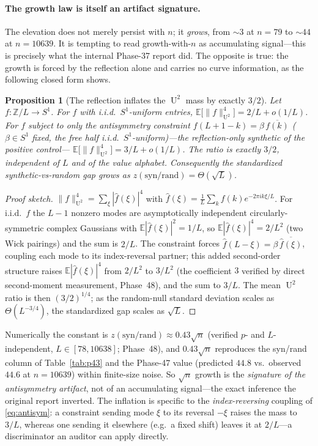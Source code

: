 \documentclass[11pt]{article}
\newtheorem{proposition}{Proposition}
\theoremstyle{definition}
\newcommand{\Z}{\mathbb{Z}}
\DeclareMathOperator{\Uk}{U}
\begin{document}
\paragraph{The growth law is itself an artifact signature.} The elevation
does not merely persist with $n$; it \emph{grows}, from $\sim3$ at $n=79$
to $\sim44$ at $n=10639$. It is tempting to read growth-with-$n$ as
accumulating signal---this is precisely what the internal Phase-37 report
did. The opposite is true: the growth is forced by the reflection alone
and carries no curve information, as the following closed form shows.

\begin{proposition}[The reflection inflates the $\Uk^2$ mass by exactly
$3/2$]\label{prop:scaling}
Let $f\colon\Z/L\to S^1$. For $f$ with i.i.d.\ $S^1$-uniform entries,
$\mathbb E\big[\|f\|_{\Uk^2}^4\big]=2/L+o(1/L)$. For $f$ subject to
\emph{only} the antisymmetry constraint $f(L{+}1{-}k)=\beta\,\overline{f(k)}$
($\beta\in S^1$ fixed, the free half i.i.d.\ $S^1$-uniform)---the
reflection-only synthetic of the positive control---%
$\mathbb E\big[\|f\|_{\Uk^2}^4\big]=3/L+o(1/L)$. The ratio is exactly
$3/2$, independent of $L$ and of the value alphabet. Consequently the
standardized synthetic-vs-random gap grows as
$z(\mathrm{syn/rand})=\Theta(\sqrt L)$.
\end{proposition}

\begin{proof}[Proof sketch]
$\|f\|_{\Uk^2}^4=\sum_\xi|\hat f(\xi)|^4$ with
$\hat f(\xi)=\tfrac1L\sum_k f(k)e^{-2\pi ik\xi/L}$. For i.i.d.\ $f$ the
$L-1$ nonzero modes are asymptotically independent circularly-symmetric
complex Gaussians with $\mathbb E|\hat f(\xi)|^2=1/L$, so
$\mathbb E|\hat f(\xi)|^4=2/L^2$ (two Wick pairings) and the sum is
$2/L$. The constraint forces $\hat f(L{-}\xi)=\beta\,\overline{\hat
f(\xi)}$, coupling each mode to its index-reversal partner; this added
second-order structure raises $\mathbb E|\hat f(\xi)|^4$ from $2/L^2$ to
$3/L^2$ (the coefficient $3$ verified by direct second-moment
measurement, Phase~48), and the sum to $3/L$. The
mean $\Uk^2$ ratio is then $(3/2)^{1/4}$; as the random-null standard
deviation scales as $\Theta(L^{-3/4})$, the standardized gap scales as
$\sqrt L$.
\end{proof}

Numerically the constant is $z(\mathrm{syn/rand})\approx0.43\sqrt n$
(verified $p$- and $L$-independent, $L\in[78,10638]$; Phase~48), and
$0.43\sqrt n$ reproduces the syn/rand column of Table~\ref{tab:p43} and
the Phase-47 value (predicted $44.8$ vs.\ observed $44.6$ at $n=10639$)
within finite-size noise. So $\sqrt n$ growth is the \emph{signature of
the antisymmetry artifact}, not of an accumulating signal---the exact
inference the original report inverted. The inflation is specific to
the \emph{index-reversing} coupling of \eqref{eq:antisym}: a constraint
sending mode $\xi$ to its reversal $-\xi$ raises the mass to $3/L$,
whereas one sending it elsewhere (e.g.\ a fixed shift) leaves it at
$2/L$---a discriminator an auditor can apply directly.
\end{document}
